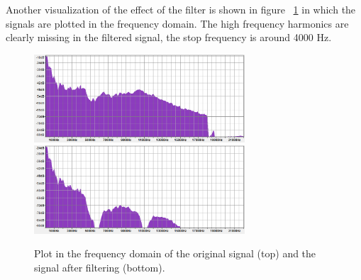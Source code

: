 Another visualization of the effect of the filter is shown in figure  ~\ref{fig:spectrum} in which the signals are plotted in the frequency domain. The high frequency harmonics are clearly missing in the filtered signal, the stop frequency is around 4000 Hz. 

\begin{figure}
\begin{center}
\includegraphics[width=0.7\textwidth]{images/spectrum_input.png}
\includegraphics[width=0.7\textwidth]{images/spectrum_output.png}
\caption{Plot in the frequency domain of the original signal (top) and the signal after filtering (bottom).}
\label{fig:spectrum}
\end{center}
\end{figure}


\FloatBarrier
